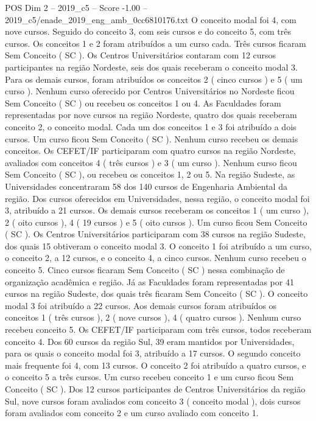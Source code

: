 \begin{textsample}{POS Dim 2 – 2019\_c5 – Score -1.00 – 2019\_c5/enade\_2019\_eng\_amb\_0cc6810176.txt}
O conceito modal foi 4, com nove cursos.
Seguido do conceito 3, com seis cursos e do conceito 5, com três cursos.
Os conceitos 1 e 2 foram atribuídos a um curso cada.
Três cursos ficaram Sem Conceito ( SC ).
Os Centros Universitários contaram com 12 cursos participantes na região Nordeste, seis dos quais receberam o conceito modal 3.
Para os demais cursos, foram atribuídos os conceitos 2 ( cinco cursos ) e 5 ( um curso ).
Nenhum curso oferecido por Centros Universitários no Nordeste ficou Sem Conceito ( SC ) ou recebeu os conceitos 1 ou 4.
As Faculdades foram representadas por nove cursos na região Nordeste, quatro dos quais receberam conceito 2, o conceito modal.
Cada um dos conceitos 1 e 3 foi atribuído a dois cursos.
Um curso ficou Sem Conceito ( SC ).
Nenhum curso recebeu os demais conceitos.
Os CEFET/IF participaram com quatro cursos na região Nordeste, avaliados com conceitos 4 ( três cursos ) e 3 ( um curso ).
Nenhum curso ficou Sem Conceito ( SC ), ou recebeu os conceitos 1, 2 ou 5.
Na região Sudeste, as Universidades concentraram 58 dos 140 cursos de Engenharia Ambiental da região.
Dos cursos oferecidos em Universidades, nessa região, o conceito modal foi 3, atribuído a 21 cursos.
Os demais cursos receberam os conceitos 1 ( um curso ), 2 ( oito cursos ), 4 ( 19 cursos ) e 5 ( oito cursos ).
Um curso ficou Sem Conceito ( SC ).
Os Centros Universitários participaram com 38 cursos na região Sudeste, dos quais 15 obtiveram o conceito modal 3.
O conceito 1 foi atribuído a um curso, o conceito 2, a 12 cursos, e o conceito 4, a cinco cursos.
Nenhum curso recebeu o conceito 5.
Cinco cursos ficaram Sem Conceito ( SC ) nessa combinação de organização acadêmica e região.
Já as Faculdades foram representadas por 41 cursos na região Sudeste, dos quais três ficaram Sem Conceito ( SC ).
O conceito modal 3 foi atribuído a 22 cursos.
Aos demais cursos foram atribuídos os conceitos 1 ( três cursos ), 2 ( nove cursos ), 4 ( quatro cursos ).
Nenhum curso recebeu conceito 5.
Os CEFET/IF participaram com três cursos, todos receberam conceito 4.
Dos 60 cursos da região Sul, 39 eram mantidos por Universidades, para os quais o conceito modal foi 3, atribuído a 17 cursos.
O segundo conceito mais frequente foi 4, com 13 cursos.
O conceito 2 foi atribuído a quatro cursos, e o conceito 5 a três cursos.
Um curso recebeu conceito 1 e um curso ficou Sem Conceito ( SC ).
Dos 12 cursos participantes de Centros Universitários da região Sul, nove cursos foram avaliados com conceito 3 ( conceito modal ), dois cursos foram avaliados com conceito 2 e um curso avaliado com conceito 1.

\end{textsample}
